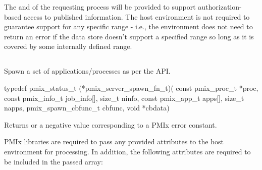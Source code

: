 \advicermstart
The  and  of the requesting process will be provided to support authorization-based access to published information. The host environment is not required to guarantee support for any specific range - i.e., the environment does not need to return an error if the data store doesn't support a specified range so long as it is covered by some internally defined range.
\advicermend


\subsection{}

\summary

Spawn a set of applications/processes as per the  API.

\format

\cspecificstart
\begin{codepar}
typedef pmix_status_t (*pmix_server_spawn_fn_t)(
                             const pmix_proc_t *proc,
                             const pmix_info_t job_info[],
                             size_t ninfo,
                             const pmix_app_t apps[],
                             size_t napps,
                             pmix_spawn_cbfunc_t cbfunc,
                             void *cbdata)
\end{codepar}
\cspecificend

\begin{arglist}
\end{arglist}

Returns  or a negative value corresponding to a PMIx error constant.

\reqattrstart
\ac{PMIx} libraries are required to pass any provided attributes to the host environment for processing. In addition, the following attributes are required to be included in the passed  array:

